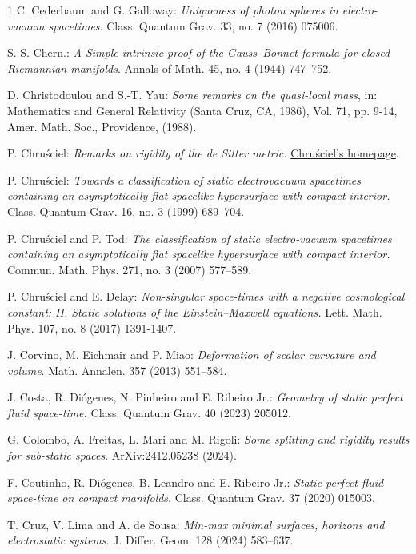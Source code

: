 \documentclass{amsart}
\numberwithin{equation}{section}
\begin{document}
\begin{thebibliography}{1}
		 C. Cederbaum and G. Galloway: \emph{Uniqueness of photon spheres in electro-vacuum spacetimes}. Class. Quantum Grav. 33, no. 7 (2016) 075006.
		
 S.-S. Chern.: \emph{A Simple intrinsic proof of the Gauss--Bonnet formula for closed Riemannian manifolds}. Annals of Math. 45, no. 4 (1944) 747--752.
		
		 D. Christodoulou and S.-T. Yau: \emph{Some remarks on the quasi-local mass}, in: Mathematics and General Relativity (Santa Cruz, CA, 1986), Vol. 71, pp. 9-14, Amer. Math. Soc., Providence, (1988).

 P. Chru\'sciel: \emph{Remarks on rigidity of the de Sitter metric.} \href{https://homepage.univie.ac.at/piotr.chrusciel/papers/deSitter/deSitter2.pdf}{Chru\'sciel's homepage}.		
				
 P. Chru\'sciel:  {\em Towards a classification of static electrovacuum spacetimes containing an asymptotically flat spacelike hypersurface with compact interior.} Class. Quantum Grav. 16, no. 3 (1999) 689–704.
		
		 P. Chru\'sciel and P. Tod: \emph{The classification of static electro-vacuum spacetimes containing an asymptotically flat spacelike hypersurface with compact interior.} Commun. Math. Phys. 271, no. 3 (2007) 577--589.
		
		 P. Chru\'sciel and E. Delay: \emph{Non-singular space-times with a negative cosmological constant: II. Static solutions of the Einstein–Maxwell equations.} Lett. Math. Phys. 107, no. 8 (2017) 1391-1407.
		
 J. Corvino, M. Eichmair and P. Miao: {\it Deformation of scalar curvature and volume}. Math. Annalen. 357 (2013) 551--584.
		
		 J. Costa, R. Di\'ogenes, N. Pinheiro and E. Ribeiro Jr.: \emph{Geometry of static perfect fluid space-time.} Class. Quantum Grav. 40 (2023) 205012.
		
		 G. Colombo, A. Freitas, L. Mari and M. Rigoli: \emph{Some splitting and rigidity results for sub-static spaces}. ArXiv:2412.05238 (2024).
		
		 F. Coutinho, R. Di\'ogenes, B. Leandro and E. Ribeiro Jr.: \emph{Static perfect fluid space-time on compact manifolds}. Class. Quantum Grav. 37 (2020) 015003.
		

 T. Cruz, V. Lima and A. de Sousa: \emph{Min-max minimal surfaces, horizons and electrostatic systems}. J. Differ. Geom. 128 (2024) 583--637.


\end{thebibliography}
\end{document}
